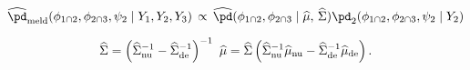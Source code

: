 \begin{equation}
\begin{gathered}
  \widehat{\pd}_{\text{meld}} (\phi_{1 \cap 2}, \phi_{2 \cap 3}, \psi_{2} \mid Y_{1}, Y_{2}, Y_{3})
  \, \propto \,
  \widehat{\pd}(\phi_{1 \cap 2}, \phi_{2 \cap 3} \mid \widehat{\mu}, \, \widehat{\Sigma})
  \pd_{2}(\phi_{1 \cap 2}, \phi_{2 \cap 3}, \psi_{2} \mid Y_{2}) \\[1.5ex] 
  \widehat{\Sigma} = \left(
    \widehat{\Sigma}_{\text{nu}}^{-1} - \widehat{\Sigma}_{\text{de}}^{-1}
  \right)^{-1} \,\,
  \widehat{\mu} = \widehat{\Sigma} \left(
    \widehat{\Sigma}_{\text{nu}}^{-1}\widehat{\mu}_{\text{nu}} - \widehat{\Sigma}_{\text{de}}^{-1}\widehat{\mu}_{\text{de}}
  \right).
\end{gathered}
\label{eqn:final-normal-approx}
\end{equation}
